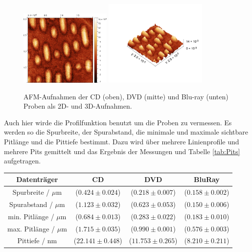 \begin{figure}
            \includegraphics[width = 0.40\textwidth]{pictures/BluRay.png}
            \includegraphics[width = 0.45\textwidth]{pictures/BluRay3D.png}
            \caption{AFM-Aufnahmen der CD (oben), DVD (mitte) und Blu-ray (unten) Proben als 2D- und 3D-Aufnahmen.}
            \label{fig:CDB}    
        \end{figure}
        Auch hier wirde die Profilfunktion benutzt um die Proben zu vermessen. Es werden so die Spurbreite, der Spurabstand, die minimale und maximale sichtbare Pitlänge und die Pittiefe bestimmt. Dazu wird über mehrere Linienprofile und mehrere Pits gemittelt und das Ergebnis der Messungen und Tabelle \ref{tab:Pits} aufgetragen.
        \begin{center}
            \label{tab:Pits}
            \begin{tabular}{c c c c}
                \toprule
                Datenträger & CD & DVD & BluRay \\
                \midrule
                Spurbreite / $\mu\text{m}$    & ($0.424\pm 0.024$) & ($0.218\pm 0.007$) & ($0.158\pm 0.002$) \\
                Spurabstand / $\mu\text{m}$   & ($1.123\pm 0.032$) & ($0.623\pm 0.053$) & ($0.150\pm 0.006$) \\
                min. Pitlänge / $\mu\text{m}$ & ($0.684\pm 0.013$) & ($0.283\pm 0.022$) & ($0.183\pm 0.010$) \\
                max. Pitlänge / $\mu\text{m}$ & ($1.715\pm 0.035$) & ($0.990\pm 0.001$) & ($0.576\pm 0.003$) \\
                Pittiefe / $\text{nm}$        & ($22.141\pm 0.448$)& ($11.753\pm 0.265$) &($8.210\pm 0.211$) \\
                \bottomrule
            \end{tabular}
        \end{center}

